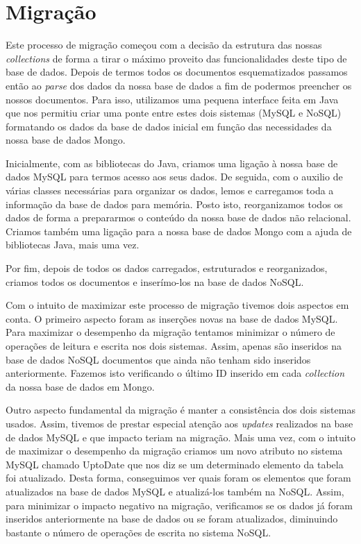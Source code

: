 \chapter{Migração}
\label{chapter:migracao}
Este processo de migração começou com a decisão da estrutura das nossas \emph{collections} de forma a tirar o máximo proveito das funcionalidades deste tipo de base de dados.
Depois de termos todos os documentos esquematizados passamos então ao \emph{parse} dos dados da nossa base de dados a fim de podermos preencher os nossos documentos. Para isso, utilizamos uma pequena interface feita em Java que nos permitiu criar uma ponte entre estes dois sistemas (MySQL e NoSQL) formatando os dados da base de dados inicial em função das necessidades da nossa base de dados Mongo.\par
Inicialmente, com as bibliotecas do Java, criamos uma ligação à nossa base de dados MySQL para termos acesso aos seus dados. De seguida, com o auxilio de várias classes necessárias para organizar os dados, lemos e carregamos toda a informação da base de dados para memória. Posto isto, reorganizamos todos os dados de forma a prepararmos o conteúdo da nossa base de dados não relacional. Criamos também uma ligação para a nossa base de dados Mongo com a ajuda de bibliotecas Java, mais uma vez. \par
Por fim, depois de todos os dados carregados, estruturados e reorganizados, criamos todos os documentos e inserímo-los na base de dados NoSQL.

Com o intuito de maximizar este processo de migração tivemos dois aspectos em conta.
O primeiro aspecto foram as inserções novas na base de dados MySQL. Para maximizar o desempenho da migração tentamos minimizar o número de operações de leitura e escrita nos dois sistemas. Assim, apenas são inseridos na base de dados NoSQL documentos que ainda não tenham sido inseridos anteriormente. Fazemos isto verificando o último ID inserido em cada \emph{collection} da nossa base de dados em Mongo. 

Outro aspecto fundamental da migração é manter a consistência dos dois sistemas usados. Assim, tivemos de prestar especial atenção aos \emph{updates} realizados na base de dados MySQL e que impacto teriam na migração. Mais uma vez, com o intuito de maximizar o desempenho da migração criamos um novo atributo no sistema MySQL chamado UptoDate que nos diz se um determinado elemento da tabela foi atualizado. Desta forma, conseguimos ver quais foram os elementos que foram atualizados na base de dados MySQL e atualizá-los também na NoSQL. Assim, para minimizar o impacto negativo na migração, verificamos se os dados já foram inseridos anteriormente na base de dados ou se foram atualizados, diminuindo bastante o número de operações de escrita no sistema NoSQL.



